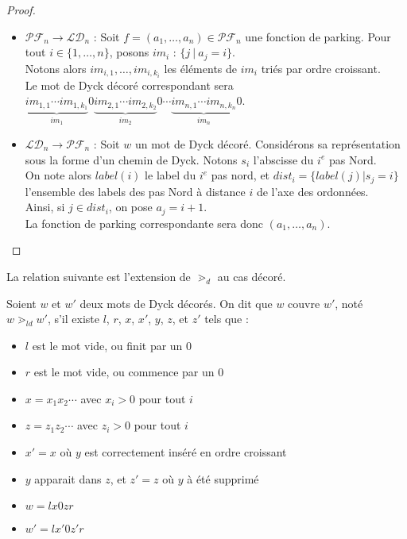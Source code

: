 \begin{proof}
    ~\
    \begin{itemize}
        \item $\mathcal{PF}_n \to \mathcal{LD}_n$ :
        Soit $f = (a_1, \ldots, a_n) \in \mathcal{PF}_n$ une fonction de
        parking. Pour tout $i \in \{1, \ldots, n\}$, posons $im_i$ :
        $\{j\ |\ a_j = i\}$. \\
        Notons alors $im_{i,1}, \ldots, im_{i,k_i}$ les éléments de $im_i$
        triés par ordre croissant.\\
        Le mot de Dyck décoré correspondant sera 
        $\underbrace{im_{1,1} \cdots im_{1,k_1}}_{im_1}0
         \underbrace{im_{2,1} \cdots im_{2,k_2}}_{im_2}0
         \cdots
         \underbrace{im_{n,1} \cdots im_{n,k_n}}_{im_n}0$.

        \item $\mathcal{LD}_n \to \mathcal{PF}_n$ :
        Soit $w$ un mot de Dyck décoré. Considérons sa représentation sous
        la forme d'un chemin de Dyck. Notons $s_i$ l'abscisse du $i^{e}$ pas
        Nord.\\
        On note alors $label(i)$ le label du $i^{e}$ pas nord, et
        $dist_i = \{label(j) | s_j = i\}$ l'ensemble  des labels des pas
        Nord à distance $i$ de l'axe des ordonnées.\\
        Ainsi, si $j \in dist_i$, on pose $a_j = i + 1$.\\
        La fonction de parking correspondante sera donc $(a_1, \ldots, a_n)$.
    \end{itemize}
\end{proof}

La relation suivante est l'extension de $\gtrdot_d$ au cas décoré.

\begin{definition}[$\gtrdot_{ld}$]
    Soient $w$ et $w'$ deux mots de Dyck décorés. On dit que $w$ couvre
    $w'$, noté $w \gtrdot_{ld} w'$, s'il existe $l$, $r$, $x$, $x'$, $y$,
    $z$, et $z'$ tels que :
    \begin{itemize}
        \item $l$ est le mot vide, ou finit par un $0$
        \item $r$ est le mot vide, ou commence par un $0$
        \item $x = x_1x_2 \cdots$ avec $x_i > 0$ pour tout $i$
        \item $z = z_1z_2 \cdots$ avec $z_i > 0$ pour tout $i$
        \item $x' = x$ où $y$ est correctement inséré en ordre croissant
        \item $y$ apparait dans $z$, et $z' = z$ où $y$ à été supprimé
        \item $w = lx0zr$
        \item $w' = lx'0z'r$
    \end{itemize}
\end{definition}

